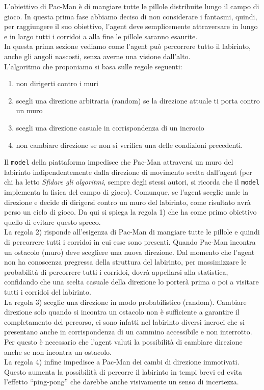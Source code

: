 \documentclass[8pt]{book}
\begin{document}
L'obiettivo di Pac-Man è di mangiare tutte le pillole distribuite lungo il campo di gioco. In questa prima fase abbiamo deciso di non considerare i fantasmi, quindi, per raggiungere il suo obiettivo, l'agent deve semplicemente attraversare in lungo e in largo tutti i corridoi a alla fine le pillole saranno esaurite.\\
In questa prima sezione vediamo come l'agent può percorrere tutto il labirinto, anche gli angoli nascosti, senza averne una visione dall'alto.\\
L'algoritmo che proponiamo si basa sulle regole seguenti:

\begin{enumerate}
\item
  non dirigerti contro i muri
\item
  scegli una direzione arbitraria (random) se la direzione attuale ti porta contro un muro
\item
  scegli una direzione casuale in corrispondenza di un incrocio
\item
  non cambiare direzione se non si verifica una delle condizioni precedenti.
\end{enumerate}

Il \texttt{model} della piattaforma impedisce che Pac-Man attraversi un muro del labirinto indipendentemente dalla direzione di movimento scelta dall'agent (per chi ha letto \emph{Sfidare gli algoritmi}, sempre degli stessi autori, si ricorda che il \texttt{model} implementa la fisica del campo di gioco). Comunque, se l'agent sceglie male la direzione e decide di dirigersi contro un muro del labirinto, come risultato avrà perso un ciclo di gioco. Da qui si spiega la regola 1) che ha come primo obiettivo quello di evitare questo spreco.\\
La regola 2) risponde all'esigenza di Pac-Man di mangiare tutte le pillole e quindi di percorrere tutti i corridoi in cui esse sono presenti. Quando Pac-Man incontra un ostacolo (muro) deve scegliere una nuova direzione. Dal momento che l'agent non ha conoscenza pregressa della struttura del labirinto, per massimizzare le probabilità di percorrere tutti i corridoi, dovrà appellarsi alla statistica, confidando che una scelta casuale della direzione lo porterà prima o poi a visitare tutti i corridoi del labirinto.\\
La regola 3) sceglie una direzione in modo probabilistico (random). Cambiare direzione solo quando si incontra un ostacolo non è sufficiente a garantire il completamento del percorso, ci sono infatti nel labirinto diversi incroci che si presentano anche in corrispondenza di un cammino accessibile e non interrotto. Per questo è necessario che l'agent valuti la possibilità di cambiare direzione anche se non incontra un ostacolo.\\
La regola 4) infine impedisce a Pac-Man dei cambi di direzione immotivati. Questo aumenta la possibilità di percorre il labirinto in tempi brevi ed evita l'effetto ``ping-pong'' che darebbe anche visivamente un senso di incertezza.\\
\end{document}
